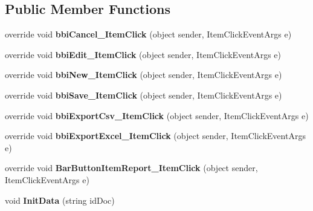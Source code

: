 \subsection*{Public Member Functions}
\begin{DoxyCompactItemize}
\item 
\mbox{\label{class_h_k_supply_1_1_forms_1_1_supply_1_1_packing_list__v2_a2e0c9fcde026cee9f293b2a49f311432}} 
override void {\bfseries bbi\+Cancel\+\_\+\+Item\+Click} (object sender, Item\+Click\+Event\+Args e)
\item 
\mbox{\label{class_h_k_supply_1_1_forms_1_1_supply_1_1_packing_list__v2_af29c58994f65a6ebcce40160a754873a}} 
override void {\bfseries bbi\+Edit\+\_\+\+Item\+Click} (object sender, Item\+Click\+Event\+Args e)
\item 
\mbox{\label{class_h_k_supply_1_1_forms_1_1_supply_1_1_packing_list__v2_a7657e83825e84f8aec8c780ba3655fa7}} 
override void {\bfseries bbi\+New\+\_\+\+Item\+Click} (object sender, Item\+Click\+Event\+Args e)
\item 
\mbox{\label{class_h_k_supply_1_1_forms_1_1_supply_1_1_packing_list__v2_abe10aa1e028a71d3dde98bbbdbbbb3a2}} 
override void {\bfseries bbi\+Save\+\_\+\+Item\+Click} (object sender, Item\+Click\+Event\+Args e)
\item 
\mbox{\label{class_h_k_supply_1_1_forms_1_1_supply_1_1_packing_list__v2_aa5f2989eced1c2ea7488335abc0e3218}} 
override void {\bfseries bbi\+Export\+Csv\+\_\+\+Item\+Click} (object sender, Item\+Click\+Event\+Args e)
\item 
\mbox{\label{class_h_k_supply_1_1_forms_1_1_supply_1_1_packing_list__v2_aa311ff0c03ea28bfc602e200243ac271}} 
override void {\bfseries bbi\+Export\+Excel\+\_\+\+Item\+Click} (object sender, Item\+Click\+Event\+Args e)
\item 
\mbox{\label{class_h_k_supply_1_1_forms_1_1_supply_1_1_packing_list__v2_a1e801085ddec17e296631578f395dec4}} 
override void {\bfseries Bar\+Button\+Item\+Report\+\_\+\+Item\+Click} (object sender, Item\+Click\+Event\+Args e)
\item 
\mbox{\label{class_h_k_supply_1_1_forms_1_1_supply_1_1_packing_list__v2_a9aa331ca5f73a46c4b4fc0ff7109ed20}} 
void {\bfseries Init\+Data} (string id\+Doc)
\end{DoxyCompactItemize}
